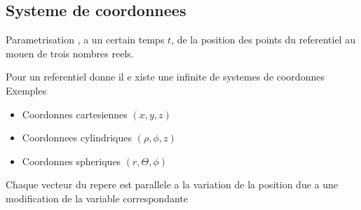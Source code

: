 \documentclass[../main.tex]{subfiles}
\begin{document}
\subsection{Systeme de coordonnees}
\begin{defn}\label{defn:systeme_de_coordonnees}
	Parametrisation , a un certain temps $t$, de la position des points du referentiel au mouen de trois nombres reels.
\end{defn}
Pour un referentiel donne il e xiste une infinite de systemes de coordonnes
Exemples
\begin{itemize}
	\item Coordonnes cartesiennes $(x,y,z)$ 
	\item Coordonnees cylindriques $(\rho, \phi, z)$ 
	\item Coordonnes spheriques $(r, \Theta, \phi)$
\end{itemize}
Chaque vecteur du repere est parallele a la variation de la position due a une modification de la variable correspondante
\end{document}
